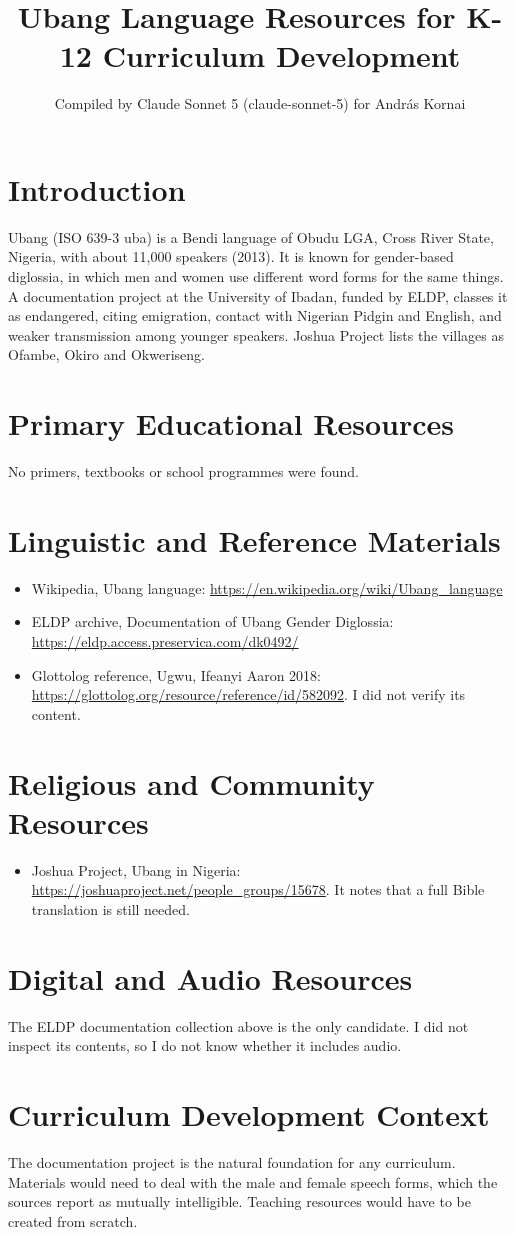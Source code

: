 \documentclass[12pt]{article}
\title{Ubang Language Resources for K-12 Curriculum Development}
\author{Compiled by Claude Sonnet 5 (claude-sonnet-5) for Andr\'as Kornai}
\date{}
\begin{document}
\maketitle
\section{Introduction}
Ubang (ISO 639-3 uba) is a Bendi language of Obudu LGA, Cross River State, Nigeria, with about 11,000 speakers (2013). It is known for gender-based diglossia, in which men and women use different word forms for the same things. A documentation project at the University of Ibadan, funded by ELDP, classes it as endangered, citing emigration, contact with Nigerian Pidgin and English, and weaker transmission among younger speakers. Joshua Project lists the villages as Ofambe, Okiro and Okweriseng.
\section{Primary Educational Resources}
No primers, textbooks or school programmes were found.
\section{Linguistic and Reference Materials}
\begin{itemize}
\item Wikipedia, Ubang language: \url{https://en.wikipedia.org/wiki/Ubang_language}
\item ELDP archive, Documentation of Ubang Gender Diglossia: \url{https://eldp.access.preservica.com/dk0492/}
\item Glottolog reference, Ugwu, Ifeanyi Aaron 2018: \url{https://glottolog.org/resource/reference/id/582092}. I did not verify its content.
\end{itemize}
\section{Religious and Community Resources}
\begin{itemize}
\item Joshua Project, Ubang in Nigeria: \url{https://joshuaproject.net/people_groups/15678}. It notes that a full Bible translation is still needed.
\end{itemize}
\section{Digital and Audio Resources}
The ELDP documentation collection above is the only candidate. I did not inspect its contents, so I do not know whether it includes audio.
\section{Curriculum Development Context}
The documentation project is the natural foundation for any curriculum. Materials would need to deal with the male and female speech forms, which the sources report as mutually intelligible. Teaching resources would have to be created from scratch.
\end{document}
